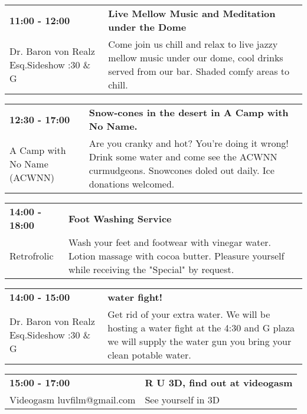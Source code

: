 \begin{tabular}{ p{1in} p{2.2in} }
    \textbf{11:00 - 12:00} & \textbf{Live Mellow Music and Meditation under the Dome} \\
    Dr. Baron von Realz Esq.Sideshow \newline 4:30 \& G & Come join us chill and relax to live jazzy mellow music under our dome, cool drinks served from our bar. Shaded comfy areas to chill. \\
    \hline 
\end{tabular}
    
\begin{tabular}{ p{1in} p{2.2in} }
    \textbf{12:30 - 17:00} & \textbf{Snow-cones in the desert in A Camp with No Name.} \\
    A Camp with No Name (ACWNN) \newline  & Are you cranky and hot? You're doing it wrong! Drink some water and come see the ACWNN curmudgeons. Snowcones doled out daily. Ice donations welcomed. \\
    \hline 
\end{tabular}
    
\begin{tabular}{ p{1in} p{2.2in} }
    \textbf{14:00 - 18:00} & \textbf{Foot Washing Service} \\
    Retrofrolic \newline  & Wash your feet and footwear with vinegar water.  Lotion massage with cocoa butter. Pleasure yourself while receiving the "Special" by request. \\
    \hline 
\end{tabular}
    
\begin{tabular}{ p{1in} p{2.2in} }
    \textbf{14:00 - 15:00} & \textbf{water fight!} \\
    Dr. Baron von Realz Esq.Sideshow \newline 4:30 \& G & Get rid of your extra water. We will be hosting a water fight at the 4:30 and G plaza we will supply the water gun you bring your clean potable water. \\
    \hline 
\end{tabular}
    
\begin{tabular}{ p{1in} p{2.2in} }
    \textbf{15:00 - 17:00} & \textbf{R U 3D, find out at videogasm} \\
    Videogasm \newline luvfilm@gmail.com & See yourself in 3D \\
    \hline 
\end{tabular}
    
